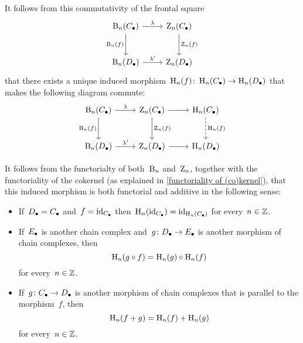 \begin{remark}
\begin{enumerate}
      It follows from this commutativity of the frontal square
      \[
        \begin{tikzcd}[row sep = large]
            \Bl_n(\Ccc)
            \arrow{r}[above]{\lambda}
            \arrow{d}[left]{\Bl_n(f)}
          & \Zl_n(\Ccc)
            \arrow{d}[right]{\Zl_n(f)}
          \\
            \Bl_n(\Dcc)
            \arrow{r}[above]{\lambda'}
          & \Zl_n(\Dcc)
        \end{tikzcd}
      \]
      that there exists a unique induced morphism~$\operatorname{H}_n(f) \colon \operatorname{H}_n(C_\bullet) \to \operatorname{H}_n(D_\bullet)$ that makes the following diagram commute:
      \[
        \begin{tikzcd}[row sep = large]
            \Bl_n(\Ccc)
            \arrow{r}[above]{\lambda}
            \arrow{d}[left]{\Bl_n(f)}
          & \Zl_n(\Ccc)
            \arrow{r}
            \arrow{d}[right]{\Zl_n(f)}
          & \Hl_n(\Ccc)
            \arrow[dashed]{d}[right]{\Hl_n(f)}
          \\
            \Bl_n(\Dcc)
            \arrow{r}[above]{\lambda'}
          & \Zl_n(\Dcc)
            \arrow{r}
          & \Hl_n(\Dcc)
        \end{tikzcd}
      \]
    \end{enumerate}

    It follows from the functorialty of both~$\operatorname{B}_n$ and~$\operatorname{Z}_n$, together with the functoriality of the cokernel (as explained in \cref{functoriality of (co)kernel}), that this induced morphism is both functorial and additive in the following sense:
    \begin{itemize}
      \item
        If~$D_\bullet = C_\bullet$ and~$f = \operatorname{id}_{C_\bullet}$ then~$\operatorname{H}_n(\operatorname{id}_{C_\bullet}) = \operatorname{id}_{\operatorname{H}_n(C_\bullet)}$ for every~$n \in \mathbb{Z}$.
      \item
        If~$E_\bullet$ is another chain complex and~$g \colon D_\bullet \to E_\bullet$ is another morphism of chain complexes, then
        \[
            \operatorname{H}_n(g \circ f)
          = \operatorname{H}_n(g) \circ \operatorname{H}_n(f)
        \]
        for every~$n \in \mathbb{Z}$.
      \item
        If~$g \colon C_\bullet \to D_\bullet$ is another morphism of chain complexes that is parallel to the morphism~$f$, then
        \[
            \operatorname{H}_n(f + g)
          = \operatorname{H}_n(f) + \operatorname{H}_n(g)
        \]
        for every~$n \in \mathbb{Z}$.
    \end{itemize}
\end{remark}


